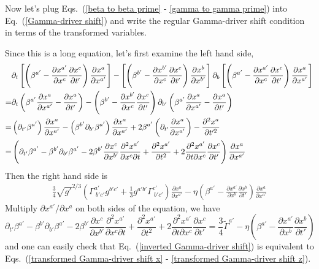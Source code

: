 \documentclass[letterpaper,nofootinbib,prd,amsmath,onecolumn]{revtex4-1}
\begin{document}
Now let's plug Eqs.~(\ref{beta to beta prime} - \ref{gamma to gamma prime}) into Eq.~(\ref{Gamma-driver shift}) and write the regular Gamma-driver shift condition in terms of the transformed variables. 

Since this is a long equation, let's first examine the left hand side, 
\begin{align}
& \partial_{t}\left[\left(\beta^{a'} - \frac{\partial x^{a'}}{\partial x^{c}}\frac{\partial x^{c}}{\partial t'}\right)\frac{\partial x^{a}}{\partial x^{a'}}\right] - \left[\left(\beta^{b'} - \frac{\partial x^{b'}}{\partial x^{c}}\frac{\partial x^{c}}{\partial t'}\right)\frac{\partial x^{b}}{\partial x^{b'}}\right]\partial_{b}\left[\left(\beta^{a'} - \frac{\partial x^{a'}}{\partial x^{c}}\frac{\partial x^{c}}{\partial t'}\right)\frac{\partial x^{a}}{\partial x^{a'}}\right]\notag\\
= & \partial_{t}\left(\beta^{a'}\frac{\partial x^{a}}{\partial x^{a'}} - \frac{\partial x^{a}}{\partial t'}\right) - \left(\beta^{b'} - \frac{\partial x^{b'}}{\partial x^{c}}\frac{\partial x^{c}}{\partial t'}\right)\partial_{b'}\left(\beta^{a'}\frac{\partial x^{a}}{\partial x^{a'}} - \frac{\partial x^{a}}{\partial t'}\right)\notag\\
= & \left(\partial_{t'}\beta^{a'}\right)\frac{\partial x^{a}}{\partial x^{a'}} - \left(\beta^{b'}\partial_{b'}\beta^{a'}\right)\frac{\partial x^{a}}{\partial x^{a'}} + 2\beta^{a'}\left(\partial_{t'}\frac{\partial x^{a}}{\partial x^{a'}}\right) - \frac{\partial^{2}x^{a}}{\partial t'^{2}}\notag\\
= & \left(\partial_{t'}\beta^{a'} - \beta^{b'}\partial_{b'}\beta^{a'} - 2\beta^{b'}\frac{\partial x^{c}}{\partial x^{b'}}\frac{\partial^{2}x^{a'}}{\partial x^{c}\partial t} + \frac{\partial^{2} x^{a'}}{\partial t^{2}} + 2\frac{\partial^{2} x^{a'}}{\partial t\partial x^{c}}\frac{\partial x^{c}}{\partial t'}\right)\frac{\partial x^{a}}{\partial x^{a'}}
\end{align}
Then the right hand side is
\begin{align}
\frac{3}{4}\sqrt{g'}^{2/3}\left(\Gamma^{a'}_{~b'c'}g^{b'c'} + \frac{1}{3}g^{a'b'}\Gamma^{c'}_{~b'c'}\right)\frac{\partial x^{a}}{\partial x^{a'}} - \eta\left(\beta^{a'} - \frac{\partial x^{a'}}{\partial x^{b}}\frac{\partial x^{b}}{\partial t'}\right)\frac{\partial x^{a}}{\partial x^{a'}}
\end{align}
Multiply $\partial x^{a'}/\partial x^{a}$ on both sides of the equation, we have
\begin{equation}
\partial_{t'}\beta^{a'} - \beta^{b'}\partial_{b'}\beta^{a'} - 2\beta^{b'}\frac{\partial x^{c}}{\partial x^{b'}}\frac{\partial^{2}x^{a'}}{\partial x^{c}\partial t} + \frac{\partial^{2} x^{a'}}{\partial t^{2}} +  2\frac{\partial^{2} x^{a'}}{\partial t\partial x^{c}}\frac{\partial x^{c}}{\partial t'} = \frac{3}{4}{\tilde \Gamma}^{a'} - \eta\left(\beta^{a'} - \frac{\partial x^{a'}}{\partial x^{b}}\frac{\partial x^{b}}{\partial t'}\right)\label{inverted Gamma-driver shift}
\end{equation}
and one can easily check that Eq.~(\ref{inverted Gamma-driver shift}) is equivalent to Eqs.~(\ref{transformed Gamma-driver shift x} - \ref{transformed Gamma-driver shift z}).
\end{document}
